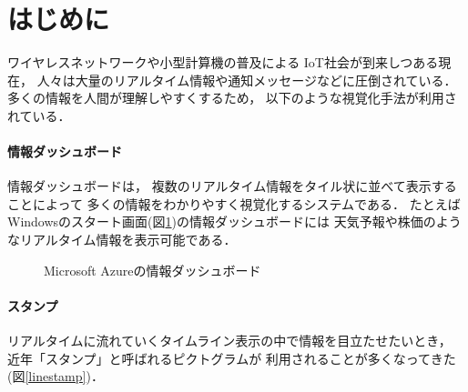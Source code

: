 \section{はじめに}


ワイヤレスネットワークや小型計算機の普及による
IoT社会が到来しつある現在，
人々は大量のリアルタイム情報や通知メッセージなどに圧倒されている．
%
多くの情報を人間が理解しやすくするため，
以下のような視覚化手法が利用されている．

\vspace{3mm}

\paragraph*{情報ダッシュボード}

情報ダッシュボード\cite{few}は，
複数のリアルタイム情報をタイル状に並べて表示することによって
多くの情報をわかりやすく視覚化するシステムである．
たとえばWindowsのスタート画面(図\ref{azure})の情報ダッシュボードには
天気予報や株価のようなリアルタイム情報を表示可能である．

\begin{figure}[h]
\centering{}
\caption{Microsoft Azureの情報ダッシュボード}
\label{azure}
\end{figure}

\vspace{2mm}
\paragraph*{スタンプ}

リアルタイムに流れていくタイムライン表示の中で情報を目立たせたいとき，
近年「スタンプ」と呼ばれるピクトグラムが
利用されることが多くなってきた(図\ref{linestamp})．

